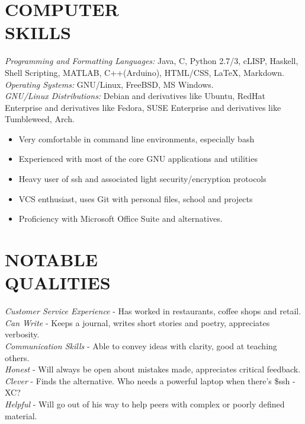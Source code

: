 \documentclass[margin]{res}
\begin{document}
\begin{resume}
\section{COMPUTER \\ SKILLS} {\sl Programming and Formatting Languages:} Java, C, Python 2.7/3, 
                cLISP, Haskell, Shell Scripting, MATLAB, C++(Arduino), HTML/CSS, LaTeX, Markdown.\\
                {\sl Operating Systems:} GNU/Linux, FreeBSD, MS Windows. \\
                 {\sl GNU/Linux Distributions:} Debian and derivatives like Ubuntu, RedHat Enterprise and derivatives like Fedora, SUSE Enterprise and derivatives like Tumbleweed, Arch.
                 \begin{itemize}  \itemsep -2pt %
                 \item Very comfortable in command line environments, especially bash
                \item Experienced with most of the core GNU applications and utilities
                \item Heavy user of ssh and associated light security/encryption protocols
                \item VCS enthusiast, uses Git with personal files, school and projects
                \item Proficiency with Microsoft Office Suite and alternatives.
\end{itemize}

\section{NOTABLE \\ QUALITIES} 
{\sl Customer Service Experience} - Has worked in restaurants, coffee shops and retail.\\
{\sl Can Write} - Keeps a journal, writes short stories and poetry, appreciates verbosity.\\
{\sl Communication Skills} - Able to convey ideas with clarity, good at teaching others.\\
{\sl Honest} - Will always be open about mistakes made, appreciates critical feedback.\\
{\sl Clever} - Finds the alternative. Who needs a powerful laptop when there's \$ssh -XC?\\
{\sl Helpful} - Will go out of his way to help peers with complex or poorly defined material.


\end{resume}
\end{document}
